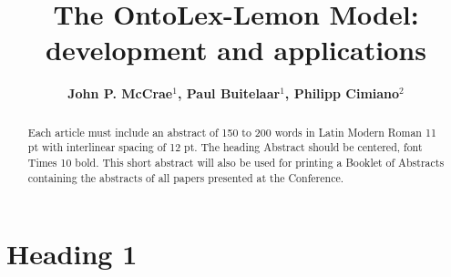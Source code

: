\documentclass[12pt,a4paper]{elex2017}
\begin{document}
\mainmatter
\title{The OntoLex-Lemon Model: development and applications}
\author{\bf John P. McCrae$^1$, Paul Buitelaar$^1$, Philipp Cimiano$^{2}$}

\maketitle

\begin{abstract}
Each article must include an abstract of 150 to 200 words in Latin Modern Roman
11 pt with interlinear spacing of 12 pt. The heading Abstract should be
centered, font Times 10 bold. This short abstract will also be used for
printing a Booklet of Abstracts containing the abstracts of all papers
    presented at the Conference.

\end{abstract}

\section{Heading 1}

\end{document}
